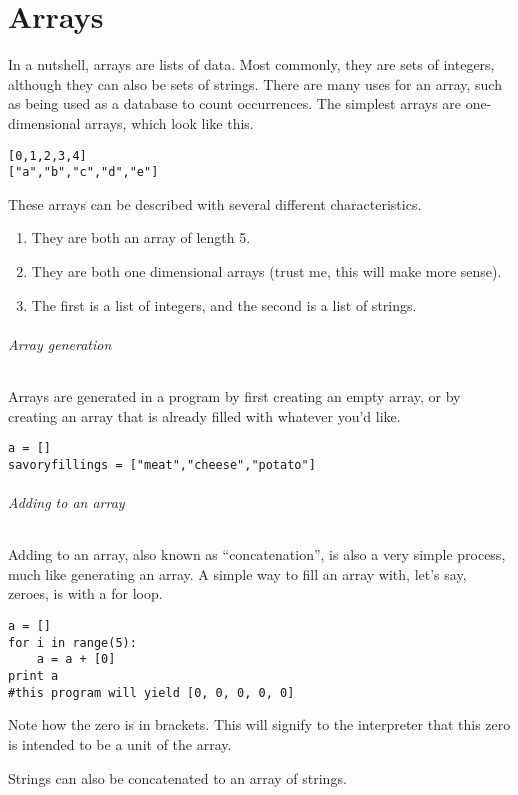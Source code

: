 




\chapter{Arrays}

In a nutshell, arrays are lists of data. Most commonly, they are sets
of integers, although they can also be sets of strings. There are
many uses for an array, such as being used as a database to count
occurrences. The simplest arrays are one-dimensional arrays, which
look like this.

\begin{lstlisting}
[0,1,2,3,4]
["a","b","c","d","e"]
\end{lstlisting}


These arrays can be described with several different characteristics.
\begin{enumerate}
\item They are both an array of length 5.
\item They are both one dimensional arrays (trust me, this will make more
sense).
\item The first is a list of integers, and the second is a list of strings.
\end{enumerate}

\subparagraph{Array generation}

Arrays are generated in a program by first creating an empty array,
or by creating an array that is already filled with whatever you'd
like.

\begin{lstlisting}
a = []
savoryfillings = ["meat","cheese","potato"]
\end{lstlisting}



\subparagraph{Adding to an array}

Adding to an array, also known as ``concatenation'', is also a very
simple process, much like generating an array. A simple way to fill
an array with, let's say, zeroes, is with a for loop.

\begin{lstlisting}
a = []
for i in range(5):
	a = a + [0]
print a
#this program will yield [0, 0, 0, 0, 0]
\end{lstlisting}


Note how the zero is in brackets. This will signify to the interpreter
that this zero is intended to be a unit of the array.

Strings can also be concatenated to an array of strings.

